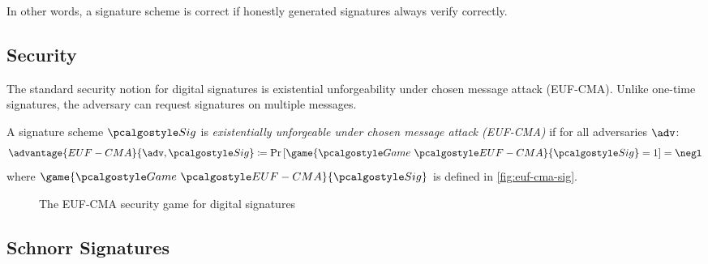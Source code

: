 In other words, a signature scheme is correct if honestly generated signatures always verify correctly.

\subsection{Security}

The standard security notion for digital signatures is existential unforgeability under chosen message attack (EUF-CMA).
Unlike one-time signatures, the adversary can request signatures on multiple messages.

\begin{definition}\label{def:euf-cma}
  A signature scheme $\algo{Sig}$ is \emph{existentially unforgeable under chosen message attack (EUF-CMA)} if for all \ppt adversaries $\adv$:
  \[
    \advantage{EUF-CMA}{\adv, \algo{Sig}} \defeq \pr{\game{\Game~\algo{EUF-CMA}}{\algo{Sig}} = 1} = \negl
  \]
  where $\game{\Game~\algo{EUF-CMA}}{\algo{Sig}}$ is defined in \autoref{fig:euf-cma-sig}.
\end{definition}

\begin{figure}[tbh]
  \begin{tcolorbox}
    \begin{pchstack}[center]
      \pchspace
    \end{pchstack}
  \end{tcolorbox}
  \caption{The EUF-CMA security game for digital signatures}
  \label{fig:euf-cma-sig}
\end{figure}

\subsection{Schnorr Signatures}

